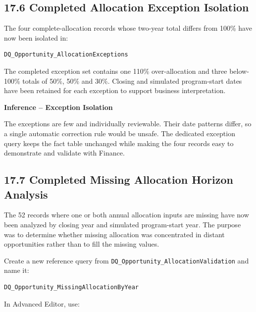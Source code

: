 \documentclass[11pt,a4paper]{article}
\begin{document}
\subsection{17.6 Completed Allocation Exception Isolation}

The four complete-allocation records whose two-year total differs from 100\%
have now been isolated in:

\begin{lstlisting}[style=powerquery]
DQ_Opportunity_AllocationExceptions
\end{lstlisting}

The completed exception set contains one 110\% over-allocation and three
below-100\% totals of 50\%, 50\% and 30\%. Closing and simulated program-start
dates have been retained for each exception to support business interpretation.

\begin{inferencebox}

\textbf{Inference -- Exception Isolation}

The exceptions are few and individually reviewable. Their date patterns differ,
so a single automatic correction rule would be unsafe. The dedicated exception
query keeps the fact table unchanged while making the four records easy to
demonstrate and validate with Finance.

\end{inferencebox}

\subsection{17.7 Completed Missing Allocation Horizon Analysis}

The 52 records where one or both annual allocation inputs are missing have now
been analyzed by closing year and simulated program-start year. The purpose was
to determine whether missing allocation was concentrated in distant
opportunities rather than to fill the missing values.

Create a new reference query from
\texttt{DQ\_Opportunity\_AllocationValidation} and name it:

\begin{lstlisting}[style=powerquery]
DQ_Opportunity_MissingAllocationByYear
\end{lstlisting}

In Advanced Editor, use:
\end{document}
